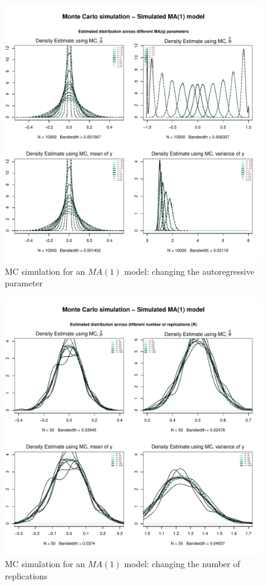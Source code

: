 \documentclass{article}
\begin{document}
\begin{figure}[hbt!]
\includegraphics[width=\textwidth]{plots/MC_MA1_densities_diff_ARq}
\caption{MC simulation for an $MA(1)$ model: changing the autoregressive parameter}
\label{fig:MC_MA1_densities_diff_ARq}
\centering
\end{figure}

\begin{figure}[hbt!]
\includegraphics[width=\textwidth]{plots/MC_MA1_densities_diff_norepl}
\caption{MC simulation for an $MA(1)$ model: changing the number of replications}
\label{fig:MC_MA1_densities_diff_norepl}
\centering
\end{figure}
\end{document}
